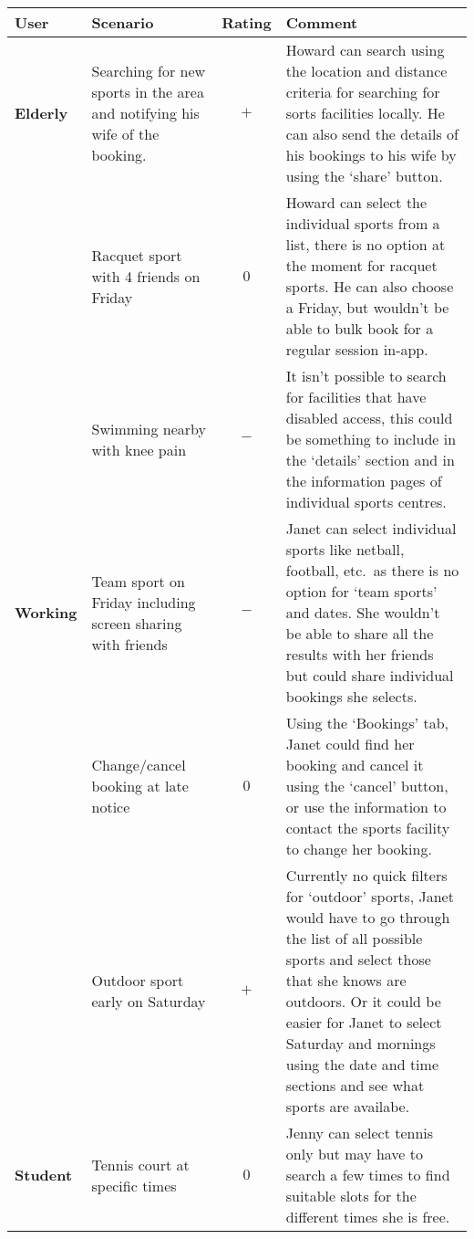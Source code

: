 \begin{center}
	\renewcommand{\arraystretch}{2}
	\begin{longtable}{p{} p{} c p{}}
		\toprule
		\textbf{User} & \textbf{Scenario} & \textbf{Rating} & \textbf{Comment}\\
		\midrule
		\textbf{Elderly} & Searching for new sports in the area and notifying
		his wife of the booking. & $+$ & Howard can search using the location and
		distance criteria for searching for sorts facilities locally. He can
		also send the details of his bookings to his wife by using the `share'
		button.\\

		& Racquet sport with 4 friends on Friday & $0$ & Howard can select the
		individual sports from a list, there is no option at the moment for
		racquet sports. He can also choose a Friday, but wouldn't be able to
		bulk book for a regular session in-app.\\

		& Swimming nearby with knee pain & $-$ & It isn't possible to search
		for facilities that have disabled access, this could be something to
		include in the `details' section and in the information pages of
		individual sports centres.\\

		\midrule \textbf{Working} & Team sport on Friday including screen
		sharing with friends& $-$ & Janet can select individual sports like
		netball, football, etc.\  as there is no option for `team sports' and
		dates. She wouldn't be able to share all the results with her friends
		but could share individual bookings she selects.\\

		& Change/cancel booking at late notice & $0$ & Using the `Bookings'
		tab, Janet could find her booking and cancel it using the `cancel'
		button, or use the information to contact the sports facility to change
		her booking.\\

		& Outdoor sport early on Saturday & $+$ & Currently no quick filters
		for `outdoor' sports, Janet would have to go through the list of all
		possible sports and select those that she knows are outdoors.  Or it
		could be easier for Janet to select Saturday and mornings using the
		date and time sections and see what sports are availabe.\\

		\midrule \textbf{Student} & Tennis court at specific times & $0$ &
		Jenny can select tennis only but may have to search a few times to find
		suitable slots for the different times she is free.\\


\end{longtable}
\end{center}
